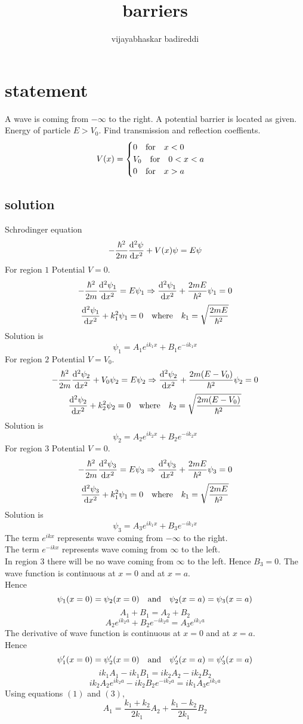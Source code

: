 \documentclass[12pt]{article}
\title{barriers}
\author{vijayabhaskar badireddi}
\begin{document}
\section*{statement}
A wave is coming from $-\infty$ to the right. A potential barrier is located as given. 
Energy of particle $E>V_0$. Find transmission and reflection coeffients.
$$
V(x)=
\begin{cases}
    0 \qq{for} x < 0 \\
    V_0 \qq{for} 0 < x < a \\
    0 \qq{for} x > a
\end{cases}
$$
\subsection*{solution}
Schrodinger equation 
\[-\frac{\hbar^2}{2m}\dv[2]{\psi}{x}+V(x)\psi=E\psi\]
For region $1$ Potential $V=0$. 
\[-\frac{\hbar^2}{2m}\dv[2]{\psi_1}{x}=E\psi_1\Rightarrow \dv[2]{\psi_1}{x}+\frac{2mE}{\hbar^2}\psi_1=0\]
\[\dv[2]{\psi_1}{x}+k_1^2\psi_1=0\qq{where} k_1=\sqrt{\frac{2mE}{\hbar^2}}\]
Solution is 
\[\psi_1=A_1e^{ik_1x}+B_1e^{-ik_1x}\]
For region $2$ Potential $V=V_0$. 
\[-\frac{\hbar^2}{2m}\dv[2]{\psi_2}{x}+V_0\psi_2=E\psi_2\Rightarrow \dv[2]{\psi_2}{x}+\frac{2m(E-V_0)}{\hbar^2}\psi_2=0\]
\[\dv[2]{\psi_2}{x}+k_2^2\psi_2=0\qq{where} k_2=\sqrt{\frac{2m(E-V_0)}{\hbar^2}}\]
Solution is 
\[\psi_2=A_2e^{ik_2x}+B_2e^{-ik_2x}\]
For region $3$ Potential $V=0$. 
\[-\frac{\hbar^2}{2m}\dv[2]{\psi_3}{x}=E\psi_3\Rightarrow \dv[2]{\psi_3}{x}+\frac{2mE}{\hbar^2}\psi_3=0\]
\[\dv[2]{\psi_3}{x}+k_1^2\psi_1=0\qq{where} k_1=\sqrt{\frac{2mE}{\hbar^2}}\]
Solution is 
\[\psi_3=A_3e^{ik_1x}+B_3e^{-ik_1x}\]
\newpage
The term $e^{ikx}$ represents wave coming from $-\infty$ to the right.\\
The term $e^{-ikx}$ represents wave coming from $\infty$ to the left.\\
In region $3$ there will be no wave coming from $\infty$ to the left. Hence $B_3=0$.
The wave function is continuous at $x=0$ and at $x=a$.\\
Hence 
\[\psi_1(x=0)=\psi_2(x=0) \qq{and} \psi_2(x=a)=\psi_3(x=a)\]
\[A_1+B_1=A_2+B_2\tag{1}\]
\[A_2e^{ik_2a}+B_2e^{-ik_2a}=A_3e^{ik_1a}\tag{2}\]
The derivative of wave function is continuous at $x=0$ and at $x=a$.\\
Hence 
\[\psi'_1(x=0)=\psi'_2(x=0) \qq{and} \psi'_2(x=a)=\psi'_3(x=a)\]
\[ik_1A_1-ik_1B_1=ik_2A_2-ik_2B_2\tag{3}\]
\[ik_2A_2e^{ik_2a}-ik_2B_2e^{-ik_2a}=ik_1A_3e^{ik_1a}\tag{4}\]
Using equations $(1)$ and $(3)$,
\[A_1=\frac{k_1+k_2}{2k_1}A_2+\frac{k_1-k_2}{2k_1}B_2\]
\end{document}
